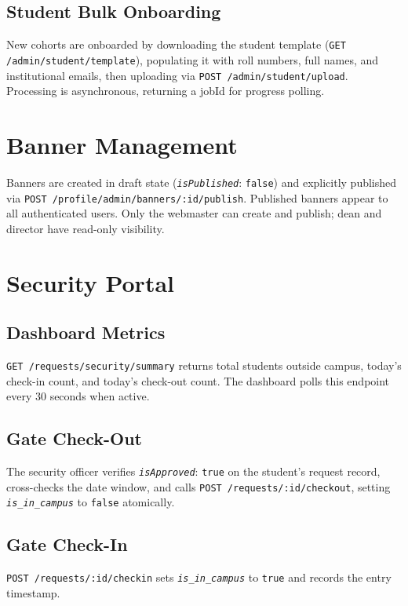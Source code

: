 \documentclass[12pt,a4paper]{report}
\newcommand{\api}[1]{\texttt{\small #1}}
\newcommand{\field}[1]{\texttt{\textit{#1}}}
\newcommand{\code}[1]{\texttt{#1}}
\begin{document}
\subsection{Student Bulk Onboarding}

New cohorts are onboarded by downloading the student template (\api{GET /admin/student/template}), populating it with roll numbers, full names, and institutional emails, then uploading via \api{POST /admin/student/upload}. Processing is asynchronous, returning a jobId for progress polling.

\section{Banner Management}

Banners are created in draft state (\field{isPublished}: \code{false}) and explicitly published via \api{POST /profile/admin/banners/:id/publish}. Published banners appear to all authenticated users. Only the webmaster can create and publish; dean and director have read-only visibility.

\section{Security Portal}

\subsection{Dashboard Metrics}

\api{GET /requests/security/summary} returns total students outside campus, today's check-in count, and today's check-out count. The dashboard polls this endpoint every 30 seconds when active.

\subsection{Gate Check-Out}

The security officer verifies \field{isApproved}: \code{true} on the student's request record, cross-checks the date window, and calls \api{POST /requests/:id/checkout}, setting \field{is\_in\_campus} to \code{false} atomically.

\subsection{Gate Check-In}

\api{POST /requests/:id/checkin} sets \field{is\_in\_campus} to \code{true} and records the entry timestamp.
\end{document}
